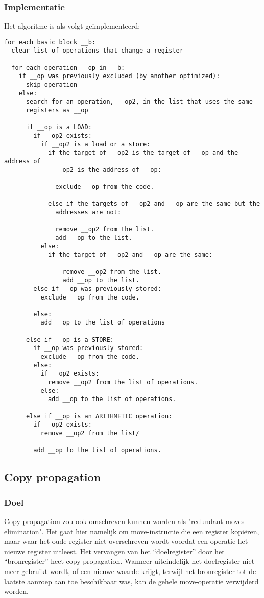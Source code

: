 \documentclass[a4paper,10pt]{article}
\begin{document}
\subsubsection{Implementatie}
Het algoritme is als volgt ge\"implementeerd:
\begin{verbatim}
for each basic block __b:
  clear list of operations that change a register

  for each operation __op in __b:
    if __op was previously excluded (by another optimized):
      skip operation
    else:
      search for an operation, __op2, in the list that uses the same
      registers as __op

      if __op is a LOAD:
        if __op2 exists:
          if __op2 is a load or a store:
            if the target of __op2 is the target of __op and the address of
              __op2 is the address of __op:

              exclude __op from the code.

            else if the targets of __op2 and __op are the same but the
              addresses are not:

              remove __op2 from the list.
              add __op to the list.
          else:
            if the target of __op2 and __op are the same:

                remove __op2 from the list.
                add __op to the list.
        else if __op was previously stored:
          exclude __op from the code.

        else:
          add __op to the list of operations

      else if __op is a STORE:
        if __op was previously stored:
          exclude __op from the code.
        else:
          if __op2 exists:
            remove __op2 from the list of operations.
          else:
            add __op to the list of operations.

      else if __op is an ARITHMETIC operation:
        if __op2 exists:
          remove __op2 from the list/

        add __op to the list of operations.
\end{verbatim}

\subsection{Copy propagation}
\subsubsection{Doel}
Copy propagation zou ook omschreven kunnen worden als "redundant moves
elimination". Het gaat hier namelijk om move-instructie die een register
kopi\"eren, maar waar het oude register niet overschreven wordt voordat een
operatie het nieuwe register uitleest. Het vervangen van het ``doelregister''
door het ``bronregister'' heet copy propagation. Wanneer uiteindelijk het
doelregister niet meer gebruikt wordt, of een nieuwe waarde krijgt, terwijl het
bronregister tot de laatste aanroep aan toe beschikbaar was, kan de gehele
move-operatie verwijderd worden.
\end{document}
